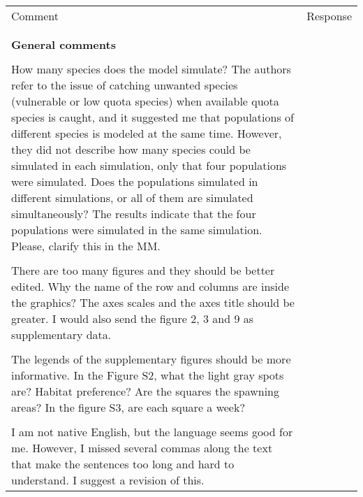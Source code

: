 \documentclass{article}
\begin{document}
\begin{landscape}
\begin{center}
	\begin{longtable}{p{12cm} | p{12cm}}
		\toprule
		Comment & Response \\
		\\
		\hline
		\\
	\textbf{General comments} &  \\
\\
		 How many species does the model simulate? The authors refer to
		 the issue of catching unwanted species (vulnerable or low
		 quota species) when available quota species is caught, and it
		 suggested me that populations of different species is modeled
		 at the same time. However, they  did not describe how many
		 species could be simulated in each simulation, only that four
		 populations were simulated. Does the populations simulated in
		 different simulations, or all of them are simulated
		 simultaneously? The results indicate that the four populations
		 were simulated in the same simulation. Please, clarify this in
		 the MM.  &  \\
\\
There are too many figures and they should be better edited. Why the name of
the row and columns are inside the graphics? The axes scales and the axes title
should be greater. I would also send the figure 2, 3 and 9 as supplementary
data.  & \\
\\
The legends of the supplementary figures should be more informative. In the
Figure S2, what the light gray spots are? Habitat preference? Are the squares
the spawning areas? In the figure S3, are each square a week?  & \\
\\
I am not native English, but the language seems good for me. However, I missed
several commas along the text that make the sentences too long and hard to
understand. I suggest a revision of this.  & \\

		\hline


\end{longtable}
\end{center}
\end{landscape}
\end{document}
